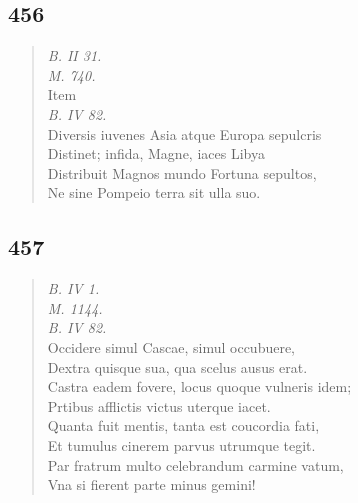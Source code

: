 \documentclass[11pt, a4paper]{report}
\begin{document}
            \subsection*{456}
      \begin{verse}
      \textit{B. II 31.} \\ \textit{M. 740.} \\ Item \\ \textit{B. IV 82.} \\ Diversis iuvenes Asia atque Europa sepulcris \\ Distinet; infida, Magne, iaces Libya \\ Distribuit Magnos mundo Fortuna sepultos, \\ Ne sine Pompeio terra sit ulla suo. \\ 
      \end{verse}
  
            \subsection*{457}
      \begin{verse}
      \textit{B. IV 1.} \\ \textit{M. 1144.} \\ \textit{B. IV 82.} \\ Occidere simul Cascae, simul occubuere, \\ Dextra quisque sua, qua scelus ausus erat. \\ Castra eadem fovere, locus quoque vulneris idem; \\ Prtibus afflictis victus uterque iacet. \\ Quanta fuit mentis, tanta est coucordia fati, \\ Et tumulus cinerem parvus utrumque tegit. \\ Par fratrum multo celebrandum carmine vatum, \\ Vna si fierent parte minus gemini! \\ 
      \end{verse}
  
\end{document}
